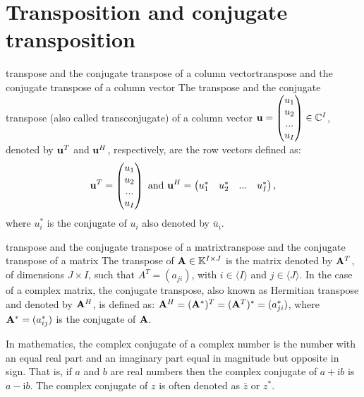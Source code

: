 \section{Transposition and conjugate transposition}
\begin{definition}{transpose and the conjugate transpose of a column vector}{transpose and the conjugate transpose of a column vector}
    The transpose and the conjugate transpose (also called transconjugate) of a column
    vector $\bold{u}=\begin{pmatrix}u_1\\ u_{2} \\ ... \\ u_{I} \end{pmatrix}\in \mathbb{C}^{I}$, 
    denoted by $\bold{u}^{T}$ and $\bold{u}^{H}$, respectively, are the row vectors defined as:
    \begin{align*}
        \bold{u}^T=\begin{pmatrix}u_1\\ u_{2} \\ ... \\ u_{I} \end{pmatrix}\text{ and } 
        \bold{u}^H=\begin{pmatrix}u_1^*& u_{2}^* & ... & u_{I}^* \end{pmatrix},
    \end{align*}
    where $u_i^*$ is the conjugate of $u_i$ also denoted by $\overline{u}_i$.
\end{definition}

\begin{definition}{transpose and the conjugate transpose of a matrix}{transpose and the conjugate transpose of a matrix}
    The transpose of $\bold{A}\in\mathbb{K}^{I\times J}$ is the matrix denoted by $\bold{A}^T$, of dimensions $J\times I$, such that $A^T=(a_{ji})$, 
    with $i\in\langle {I}\rangle$ and $j\in\langle {J}\rangle$.
    In the case of a complex matrix, the conjugate transpose, also known as Hermitian transpose and denoted by $\bold{A}^H$,
    is defined as: $\bold{A}^{H}=(\bold{A}^*)^T=(\bold{A}^T)^*=(a_{ji}^*)$,
    where $\bold{A}^*=(a_{ij}^*)$ is the conjugate of $\bold{A}$.
\end{definition}

\begin{remark}
    In mathematics, the complex conjugate of a complex number 
    is the number with an equal real part and 
    an imaginary part equal in magnitude but opposite in sign. 
    That is, if $a$ and $b$ are real numbers 
    then the complex conjugate of $a+\text{i}b$ is $a-\text{i}b$.
    The complex conjugate of $z$ is often denoted as $\bar{z}$ or $z^*$.
\end{remark}


